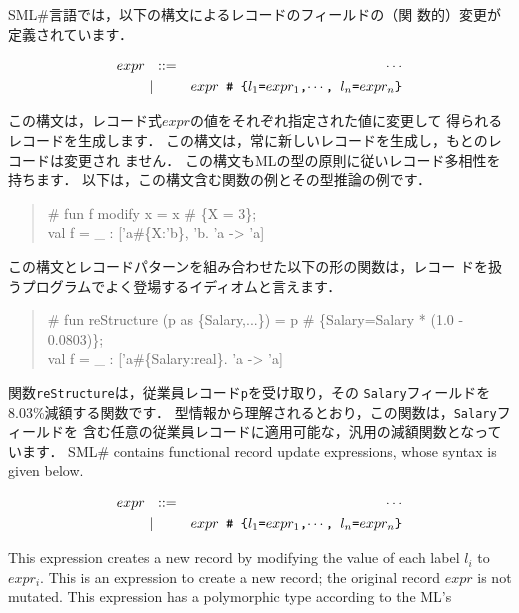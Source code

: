 \documentclass{jbook}
\newcommand{\smlsharp}{SML\#}
\newcommand{\vbar}{\mbox{\ $|$\ }}
\begin{document}
\ifjp%
	\smlsharp{}言語では，以下の構文によるレコードのフィールドの（関
数的）変更が定義されています．
\begin{tt}
\begin{eqnarray*}
expr &\mbox{\ \ }::=& \cdots \\
     &\vbar& \mbox{\tt $expr$ {\#} \{$l_1$=$expr_1$,$\cdots$, $l_n$=$expr_n$\}}
\end{eqnarray*}
\end{tt}
	この構文は，レコード式$expr$の値をそれぞれ指定された値に変更して
得られるレコードを生成します．
	この構文は，常に新しいレコードを生成し，もとのレコードは変更され
ません．
	この構文もMLの型の原則に従いレコード多相性を持ちます．
	以下は，この構文含む関数の例とその型推論の例です．
\begin{tt}\begin{quote}
\# fun f modify x = x \# \{X = 3\};\\
val f = \_ : ['a\#\{X:'b\}, 'b.  'a -> 'a]
\end{quote}\end{tt}
	この構文とレコードパターンを組み合わせた以下の形の関数は，レコー
ドを扱うプログラムでよく登場するイディオムと言えます．
\begin{tt}\begin{quote}
\# fun reStructure (p as \{Salary,...\}) = p \# \{Salary=Salary * (1.0 - 0.0803)\};\\
val f = \_ : ['a\#\{Salary:real\}.  'a -> 'a]
\end{quote}\end{tt}
	関数{\tt reStructure}は，従業員レコード{\tt p}を受け取り，その
{\tt Salary}フィールドを8.03\%減額する関数です．
	型情報から理解されるとおり，この関数は，{\tt Salary}フィールドを
含む任意の従業員レコードに適用可能な，汎用の減額関数となっています．
\else%
	\smlsharp{} contains functional record update expressions, whose
syntax is given below.
\begin{tt}
\begin{eqnarray*}
expr &\mbox{\ \ }::=& \cdots \\
     &\vbar& \mbox{\tt $expr$ {\#} \{$l_1$=$expr_1$,$\cdots$, $l_n$=$expr_n$\}}
\end{eqnarray*}
\end{tt}
	This expression creates a new record by modifying the value of
each label $l_i$ to $expr_i$.
	This is an expression to create a new record; the original
record $expr$ is not mutated.
	This expression has a polymorphic type according to the ML's
\end{document}
